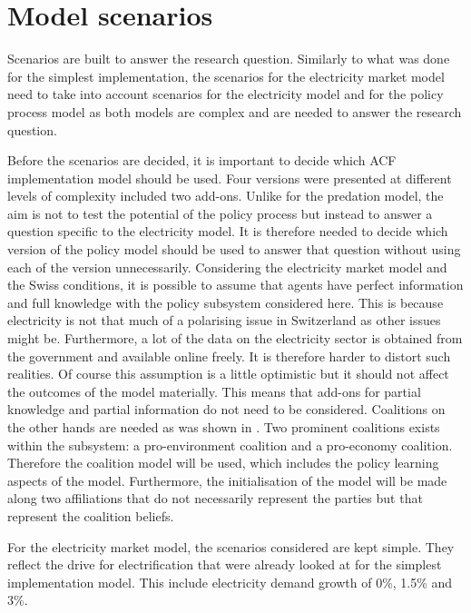 \documentclass[12pt]{article}
\begin{document}
\section{Model scenarios}
\label{sec:steps}

Scenarios are built to answer the research question. Similarly to what was done for the simplest implementation, the scenarios for the electricity market model need to take into account scenarios for the electricity model and for the policy process model as both models are complex and are needed to answer the research question.

Before the scenarios are decided, it is important to decide which ACF implementation model should be used. Four versions were presented at different levels of complexity included two add-ons. Unlike for the predation model, the aim is not to test the potential of the policy process but instead to answer a question specific to the electricity model. It is therefore needed to decide which version of the policy model should be used to answer that question without using each of the version unnecessarily. Considering the electricity market model and the Swiss conditions, it is possible to assume that agents have perfect information and full knowledge with the policy subsystem considered here. This is because electricity is not that much of a polarising issue in Switzerland as other issues might be. Furthermore, a lot of the data on the electricity sector is obtained from the government and available online freely. It is therefore harder to distort such realities. Of course this assumption is a little optimistic but it should not affect the outcomes of the model materially. This means that add-ons for partial knowledge and partial information do not need to be considered. Coalitions on the other hands are needed as was shown in \cite{markard2016socio}. Two prominent coalitions exists within the subsystem: a pro-environment coalition and a pro-economy coalition. Therefore the coalition model will be used, which includes the policy learning aspects of the model. Furthermore, the initialisation of the model will be made along two affiliations that do not necessarily represent the parties but that represent the coalition beliefs.

For the electricity market model, the scenarios considered are kept simple. They reflect the drive for electrification that were already looked at for the simplest implementation model. This include electricity demand growth of 0\%, 1.5\% and 3\%.
\end{document}
